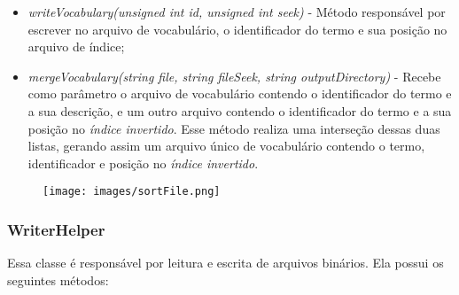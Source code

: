 \documentclass[12pt]{article}
\begin{document}
\begin{itemize}
\item \textit{writeVocabulary(unsigned int id, unsigned int seek)} - Método responsável por escrever no arquivo de vocabulário, o identificador do termo e sua posição no arquivo de índice;
\item \textit{mergeVocabulary(string file, string fileSeek, string outputDirectory)} - Recebe como parâmetro o arquivo de vocabulário contendo o identificador do termo e a sua descrição, e um outro arquivo contendo o identificador do termo e a sua posição no \textit{índice invertido}. Esse método realiza uma interseção dessas duas listas, gerando assim um arquivo único de vocabulário contendo o termo, identificador e posição no \textit{índice invertido}.
\end{itemize}

\begin{figure}[ht]
\centering
\texttt{[image: images/sortFile.png]}
\label{fig:sortFile}
\end{figure}

\subsubsection{WriterHelper} \label{sssec:writerhelper}

Essa classe é responsável por leitura e escrita de arquivos binários. Ela possui os seguintes métodos:
\end{document}
